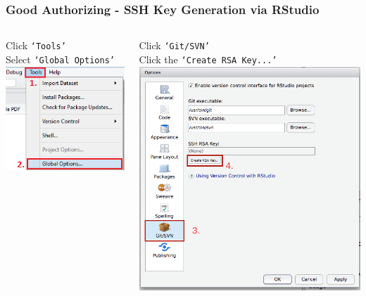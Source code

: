\documentclass{beamer}\usepackage[]{graphicx}\usepackage[]{color}
\begin{document}
\begin{frame}[fragile]
\frametitle{Good Authorizing - SSH Key Generation via RStudio}

\begin{columns}[t]
\centering
\begin{block}{Click \texttt{`Tools'} \\ Select \texttt{`Global Options'}}
\centering
\includegraphics[scale=0.5]{img/configrstudio_opt.png}
\end{block}
\centering
\begin{block}{Click \texttt{`Git/SVN'} \\ Click the \texttt{`Create RSA Key...'}}
\centering
\includegraphics[scale=0.27]{img/ssh/rstudio_blank_ssh.png}
\end{block}
\end{columns}

\end{frame}
\end{document}
